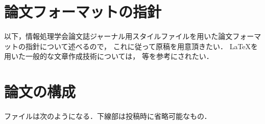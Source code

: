 \documentclass[submit,techrep,noauthor]{ipsj}
\begin{document}
\section{論文フォーマットの指針}
\label{sec:format}

以下，情報処理学会論文誌ジャーナル用スタイルファイルを用いた論文フォーマットの指針について述べるので，
これに従って原稿を用意頂きたい．
\LaTeX を用いた一般的な文章作成技術については，
\cite{okumura, companion} 等を参考にされたい．



\section{論文の構成}
\label{config}

ファイルは次のようになる．下線部は投稿時に省略可能なもの．
\end{document}
